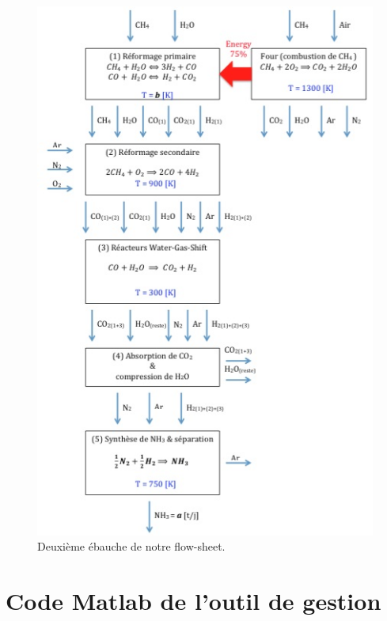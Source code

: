 \begin{figure}[htb!]
	\centering
	\includegraphics[scale=0.65]{media/flow-sheet-v2.jpg}
	\caption{Deuxième ébauche de notre flow-sheet.}
	\label{flow-sheet-v2}
\end{figure}
\newpage

\section{Code Matlab de l'outil de gestion}
\label{code-matlab-outil}




